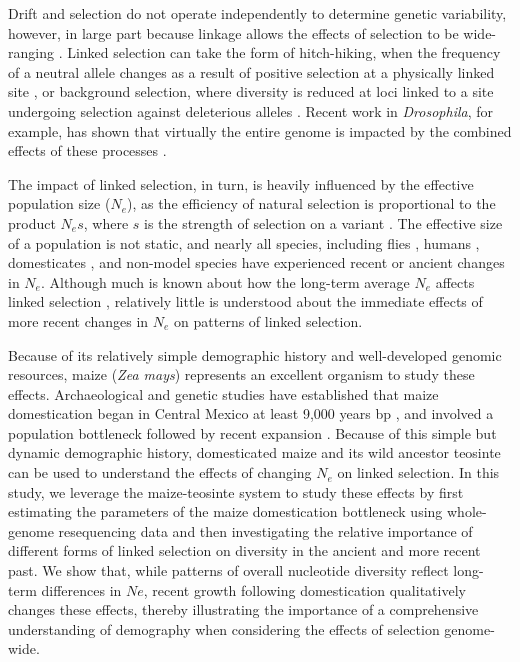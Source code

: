 \documentclass[12pt,a4paper]{article}
\begin{document}
Drift and selection do not operate independently to determine genetic variability, however, in large part because linkage allows the effects of selection to be wide-ranging \cite{smith1974, li2012,slotte2014}. 
Linked selection can take the form of hitch-hiking, when the frequency of a neutral allele changes as a result of positive selection at a physically linked site \cite{smith1974}, or background selection, where diversity is reduced at loci linked to a site undergoing selection against deleterious alleles \cite{charlesworth1993}. 
Recent work in \emph{Drosophila}, for example, has shown that virtually the entire genome is impacted by the combined effects of these processes \cite{sella2009,elyashiv2014,andolfatto2005}.

The impact of linked selection, in turn, is heavily influenced by the effective population size ($N_e$), as the  efficiency of natural selection is proportional to the product $N_es$, where $s$ is the strength of selection on a variant \cite{cutter2013, slotte2014, corbett2015,leffler2012}.
The effective size of a population is not static, and nearly all species, including flies \cite{duchen2013}, humans \cite{reich1998}, domesticates \cite{hyten2006, bovine2009}, and non-model species \cite{ellegren2014} have experienced recent or ancient changes in $N_e$. 
Although much is known about how the long-term average $N_e$ affects linked selection \cite{cutter2013}, relatively little is understood about the immediate effects of more recent changes in $N_e$ on patterns of linked selection.

Because of its relatively simple demographic history and well-developed genomic resources, maize (\emph{Zea mays}) represents an excellent organism to study these effects. 
Archaeological and genetic studies have established that maize domestication began in Central Mexico at least 9,000 years bp \cite{smith1995,matsuoka2002}, and involved a population bottleneck followed by recent expansion \cite{wright2005,eyre1998,tenaillon2004}.
Because of this simple but dynamic demographic history, domesticated maize and its wild ancestor teosinte can be used to understand the effects of changing $N_e$ on linked selection. 
In this study, we leverage the maize-teosinte system to study these effects by first estimating the parameters of the maize domestication bottleneck using whole-genome resequencing data and then investigating the relative importance of different forms of linked selection on diversity in the ancient and more recent past. 
We show that, while patterns of overall nucleotide diversity reflect long-term differences in $Ne$, recent growth following domestication qualitatively changes these effects, thereby illustrating the importance of a comprehensive understanding of demography when considering the effects of selection genome-wide. 
\end{document}
